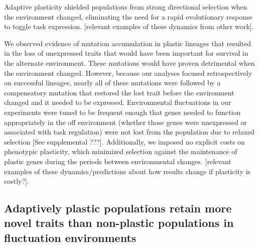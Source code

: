 Adaptive plasticity shielded populations from strong directional selection when the environment changed, eliminating the need for a rapid evolutionary response to toggle task expression. 
[relevant examples of these dynamics from other work].

We observed evidence of mutation accumulation in plastic lineages that resulted in the loss of unexpressed traits that would have been important for survival in the alternate environment.
These mutations would have proven detrimental when the environment changed.
However, because our analyses focused retrospectively on successful lineages, nearly all of these mutations were followed by a compensatory mutation that restored the lost trait before the environment changed and it needed to be expressed.
Environmental fluctuations in our experiments were tuned to be frequent enough that genes needed to function appropriately in the off environment (whether those genes were unexpressed or associated with task regulation) were not lost from the population due to relaxed selection [See supplemental ???].
Additionally, we imposed no explicit costs on phenotypic plasticity, which minimized selection against the maintenance of plastic genes during the periods between environmental changes.  
[relevant examples of these dynamics/predictions about how results change if plasticity is costly?].



\vspace{0.25cm}
\subsection{Adaptively plastic populations retain more novel traits than non-plastic populations in fluctuation environments}

